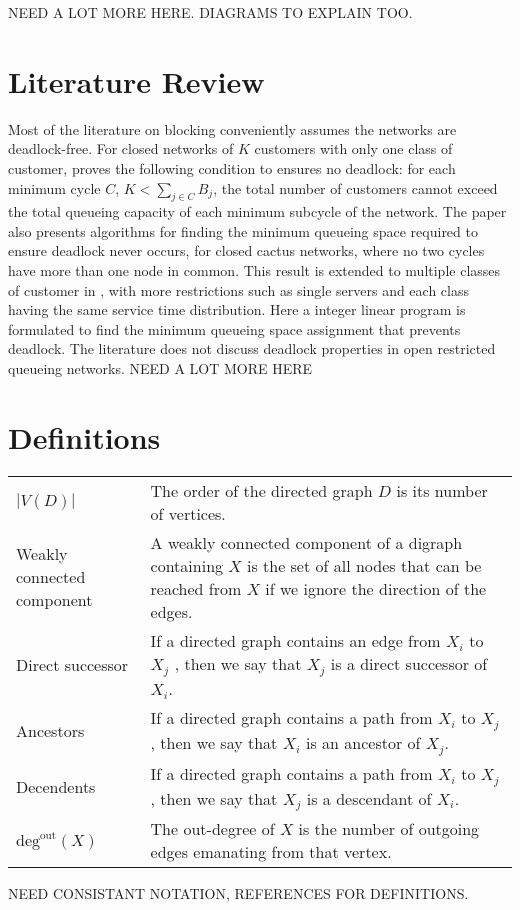 \documentclass{article}
\begin{document}
NEED A LOT MORE HERE. DIAGRAMS TO EXPLAIN TOO.

\section{Literature Review}
Most of the literature on blocking conveniently assumes the networks are deadlock-free.
For closed networks of $K$ customers with only one class of customer, \cite{kunduakyildiz89} proves the following condition to ensures no deadlock: for each minimum cycle $C$, $K < \sum_{j\in C} B_j$, the total number of customers cannot exceed the total queueing capacity of each minimum subcycle of the network.
The paper also presents algorithms for finding the minimum queueing space required to ensure deadlock never occurs, for closed cactus networks, where no two cycles have more than one node in common.
This result is extended to multiple classes of customer in \cite{liebeherrakyildiz95}, with more restrictions such as single servers and each class having the same service time distribution.
Here a integer linear program is formulated to find the minimum queueing space assignment that prevents deadlock.
The literature does not discuss deadlock properties in open restricted queueing networks.\newline
NEED A LOT MORE HERE

\section{Definitions}
\begin{tabular}{ p{5cm} p{10cm} }
  $\left| V(D) \right|$ & The order of the directed graph $D$ is its number of vertices. \\
  Weakly connected component & A weakly connected component of a digraph containing $X$ is the set of all nodes that can be reached from $X$ if we ignore the direction of the edges. \\
  Direct successor & If a directed graph contains an edge from $X_i$ to $X_j$ , then we say that $X_j$ is a direct successor of $X_i$. \\
  Ancestors & If a directed graph contains a path from $X_i$ to $X_j$ , then we say that $X_i$ is an ancestor of $X_j$. \\
  Decendents & If a directed graph contains a path from $X_i$ to $X_j$ , then we say that $X_j$ is a descendant of $X_i$. \\
  $\text{deg}^{\text{out}}(X)$ & The out-degree of $X$ is the number of outgoing edges emanating from that vertex. \\
\end{tabular}
\newline
NEED CONSISTANT NOTATION, REFERENCES FOR DEFINITIONS.
\end{document}
